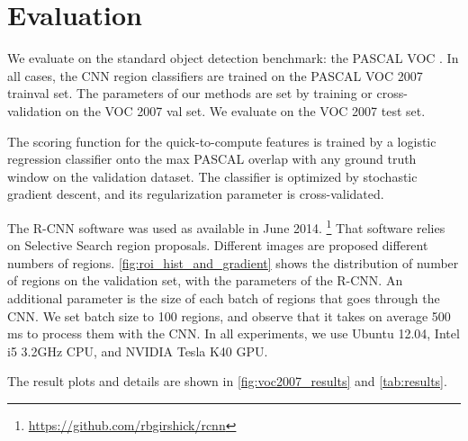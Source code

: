 \section{Evaluation}\label{sec:ccnn_evaluation}

We evaluate on the standard object detection benchmark: the PASCAL VOC \cite{pascal-voc-2010}.
In all cases, the CNN region classifiers are trained on the PASCAL VOC 2007 trainval set.
The parameters of our methods are set by training or cross-validation on the VOC 2007 val set.
We evaluate on the VOC 2007 test set.

The scoring function for the quick-to-compute features is trained by a logistic regression classifier onto the max PASCAL overlap with any ground truth window on the validation dataset.
The classifier is optimized by stochastic gradient descent, and its regularization parameter is cross-validated.

The R-CNN software was used as available in June 2014.
\footnote{\url{https://github.com/rbgirshick/rcnn}}
That software relies on Selective Search \cite{Uijlings-IJCV-2013} region proposals.
Different images are proposed different numbers of regions.
\autoref{fig:roi_hist_and_gradient} shows the distribution of number of regions on the validation set, with the parameters of the R-CNN.
An additional parameter is the size of each batch of regions that goes through the CNN.
We set batch size to 100 regions, and observe that it takes on average 500 ms to process them with the CNN.
In all experiments, we use Ubuntu 12.04, Intel i5 3.2GHz CPU, and NVIDIA Tesla K40 GPU.

The result plots and details are shown in \autoref{fig:voc2007_results} and \autoref{tab:results}.






